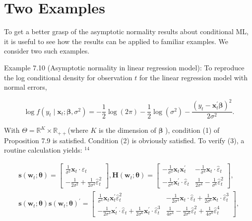 \documentclass[10pt]{article}
\begin{document}
\section*{Two Examples}
To get a better grasp of the asymptotic normality results about conditional ML, it is useful to see how the results can be applied to familiar examples. We consider two such examples.

Example 7.10 (Asymptotic normality in linear regression model): To reproduce the log conditional density for observation $t$ for the linear regression model with normal errors,


\begin{equation*}
\log f\left(y_{t} \mid \mathbf{x}_{t} ; \boldsymbol{\beta}, \sigma^{2}\right)=-\frac{1}{2} \log (2 \pi)-\frac{1}{2} \log \left(\sigma^{2}\right)-\frac{\left(y_{t}-\mathbf{x}_{t}^{\prime} \boldsymbol{\beta}\right)^{2}}{2 \sigma^{2}} . \tag{7.3.16}
\end{equation*}


With $\Theta=\mathbb{R}^{K} \times \mathbb{R}_{++}$(where $K$ is the dimension of $\boldsymbol{\beta}$ ), condition (1) of Proposition 7.9 is satisfied. Condition (2) is obviously satisfied. To verify (3), a routine calculation yields: ${ }^{14}$


\begin{gather*}
\mathbf{s}\left(\mathbf{w}_{t} ; \boldsymbol{\theta}\right)=\left[\begin{array}{c}
\frac{1}{\sigma^{2}} \mathbf{x}_{t} \cdot \hat{\varepsilon}_{t} \\
-\frac{1}{2 \sigma^{2}}+\frac{1}{2 \sigma^{4}} \hat{\varepsilon}_{t}^{2}
\end{array}\right], \mathbf{H}\left(\mathbf{w}_{t} ; \boldsymbol{\theta}\right)=\left[\begin{array}{cc}
-\frac{1}{\sigma^{2}} \mathbf{x}_{t} \mathbf{x}_{t}^{\prime} & -\frac{1}{\sigma^{4}} \mathbf{x}_{t} \cdot \hat{\varepsilon}_{t} \\
-\frac{1}{\sigma^{4}} \mathbf{x}_{t}^{\prime} \cdot \hat{\varepsilon}_{t} & \frac{1}{2 \sigma^{4}}-\frac{1}{\sigma^{6}} \hat{\varepsilon}_{t}^{2}
\end{array}\right], \\
\mathbf{s}\left(\mathbf{w}_{t} ; \boldsymbol{\theta}\right) \mathbf{s}\left(\mathbf{w}_{t} ; \boldsymbol{\theta}\right)^{\prime}=\left[\begin{array}{cc}
\frac{1}{\sigma^{4}} \mathbf{x}_{t} \mathbf{x}_{t}^{\prime} \hat{\varepsilon}_{t}^{2} & -\frac{1}{2 \sigma^{4}} \mathbf{x}_{t} \cdot \hat{\varepsilon}_{t}+\frac{1}{2 \sigma^{6}} \mathbf{x}_{t} \cdot \hat{\varepsilon}_{t}^{3} \\
-\frac{1}{2 \sigma^{4}} \mathbf{x}_{t}^{\prime} \cdot \hat{\varepsilon}_{t}+\frac{1}{2 \sigma^{6}} \mathbf{x}_{t}^{\prime} \cdot \hat{\varepsilon}_{t}^{3} & \frac{1}{4 \sigma^{4}}-\frac{1}{2 \sigma^{6}} \hat{\varepsilon}_{t}^{2}+\frac{1}{4 \sigma^{8}} \hat{\varepsilon}_{t}^{4}
\end{array}\right], \tag{7.3.17}
\end{gather*}
\end{document}

